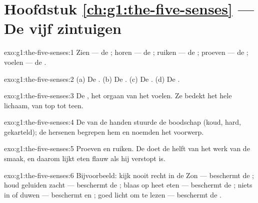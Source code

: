 \section*{Hoofdstuk \ref{ch:g1:the-five-senses} --- De vijf zintuigen}

\begin{solution}{exo:g1:the-five-senses:1}
Zien --- de ; horen --- de ; ruiken --- de ; proeven ---
de ; voelen --- de .
\end{solution}

\begin{solution}{exo:g1:the-five-senses:2}
(a) De . (b) De . (c) De . (d) De .
\end{solution}

\begin{solution}{exo:g1:the-five-senses:3}
De , het orgaan van het voelen. Ze bedekt het hele lichaam, van top
tot teen.
\end{solution}

\begin{solution}{exo:g1:the-five-senses:4}
De  van de handen stuurde de boodschap (koud, hard, gekarteld); de
hersenen begrepen hem en noemden het voorwerp.
\end{solution}

\begin{solution}{exo:g1:the-five-senses:5}
Proeven en ruiken. De  doet de helft van het werk van de smaak, en
daarom lijkt eten flauw als hij verstopt is.
\end{solution}

\begin{solution}{exo:g1:the-five-senses:6}
Bijvoorbeeld: kijk nooit recht in de Zon --- beschermt de ; houd
geluiden zacht --- beschermt de ; blaas op heet eten --- beschermt
de ; niets in  of  duwen --- beschermt  en ; goed
licht om te lezen --- beschermt de .
\end{solution}

